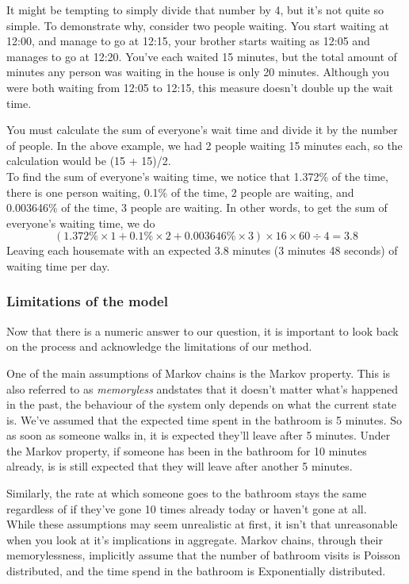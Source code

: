 It might be tempting to simply divide that number by 4, but it's not quite so simple. To demonstrate why, consider two people waiting. You start waiting at 12:00, and manage to go at 12:15, your brother starts waiting as 12:05 and manages to go at 12:20. You've each waited 15 minutes, but the total amount of minutes any person was waiting in the house is only 20 minutes. Although you were both waiting from 12:05 to 12:15, this measure doesn't double up the wait time.

You must calculate the sum of everyone's wait time and divide it by the number of people. In the above example, we had 2 people waiting 15 minutes each, so the calculation would be (15 + 15)/2.
\\

To find the sum of everyone's waiting time, we notice that 1.372\% of the time, there is one person waiting, 0.1\% of the time, 2 people are waiting, and 0.003646\% of the time, 3 people are waiting. In other words, to get the sum of everyone's waiting time, we do
$$ (1.372\% \times 1 + 0.1\% \times 2 + 0.003646\% \times 3) \times 16 \times 60 \div 4 = 3.8 $$
Leaving each housemate with an expected 3.8 minutes (3 minutes 48 seconds) of waiting time per day.

\subsubsection*{Limitations of the model}
Now that there is a numeric answer to our question, it is important to look back on the process and acknowledge the limitations of our method.

One of the main assumptions of Markov chains is the Markov property. This is also referred to as \textit{memoryless} andstates that it doesn't matter what's happened in the past, the behaviour of the system only depends on what the current state is. We've assumed that the expected time spent in the bathroom is 5 minutes. So as soon as someone walks in, it is expected they'll leave after 5 minutes. Under the Markov property, if someone has been in the bathroom for 10 minutes already, is is still expected that they will leave after another 5 minutes.

Similarly, the rate at which someone goes to the bathroom stays the same regardless of if they've gone 10 times already today or haven't gone at all.
\\

While these assumptions may seem unrealistic at first, it isn't that unreasonable when you look at it's implications in aggregate. Markov chains, through their memorylessness, implicitly assume that the number of bathroom visits is Poisson distributed, and the time spend in the bathroom is Exponentially distributed. 
